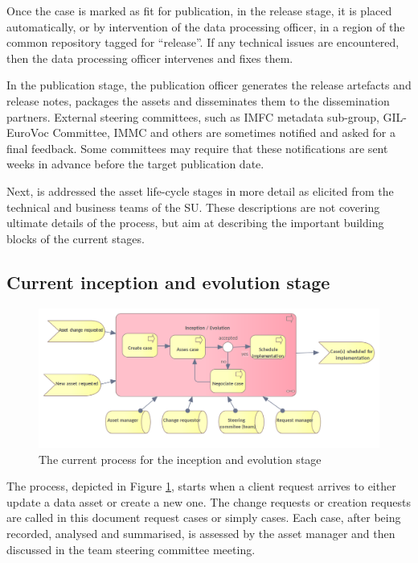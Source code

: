 	Once the case is marked as fit for publication, in the release stage, it is placed automatically, or by intervention of the data processing officer, in a region of the common repository tagged for ``release''. If any technical issues are encountered, then the data processing officer intervenes and fixes them.
	
	In the publication stage, the publication officer generates the release artefacts and release notes, packages the assets and disseminates them to the dissemination partners. External steering committees, such as IMFC metadata sub-group, GIL-EuroVoc Committee, IMMC and others are sometimes notified and asked for a final feedback. Some committees may require that these notifications are sent weeks in advance before the target publication date.
	
	Next, is addressed the asset life-cycle stages in more detail as elicited from the technical and business teams of the SU. These descriptions are not covering ultimate details of the process, but aim at describing the important building blocks of the current stages. 
	
	\subsection{Current inception and evolution stage}
	\label{sec:inception-current}
	
	\begin{figure}[h]
		\centering
		\includegraphics[width=.8\textwidth]{images/business/current/InceptionEvolution.png}
		\caption{The current process for the inception and evolution stage}
		\label{fig:evolution-current}
	\end{figure}		
	
	The process, depicted in Figure \ref{fig:evolution-current}, starts when a client request arrives to either update a data asset or create a new one. The change requests or creation requests are called in this document request cases or simply cases. Each case, after being recorded, analysed and summarised, is assessed by the asset manager and then discussed in the team steering committee meeting. 
	
